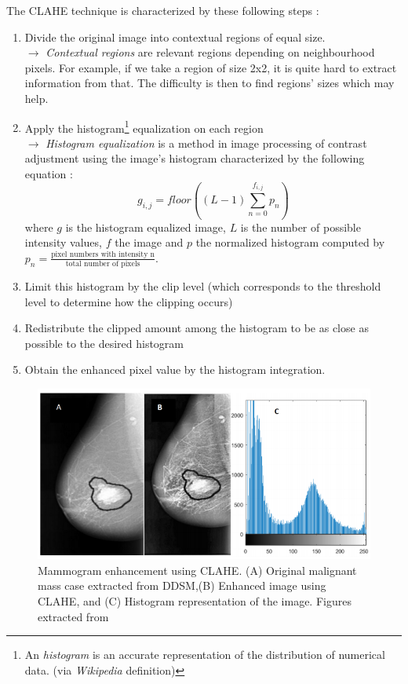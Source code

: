 \documentclass[11pt, openany]{report}
\theoremstyle{plain}
\theoremstyle{definition}
\theoremstyle{remark}
\begin{document}
The CLAHE technique is characterized by these following steps \cite{breast-cancer}: 
\begin{enumerate}
\item Divide the original image into contextual regions of equal size. \\
	  $\rightarrow$ \textit{Contextual regions} are relevant regions depending on neighbourhood pixels. For example, if we take a region of size 2x2, it is quite hard to extract information from that. The difficulty is then to find regions' sizes which may help.   
  
\item Apply the histogram\footnote{An \textit{histogram} is an accurate representation of the distribution of numerical data. (via \textit{Wikipedia} \cite{wiki} definition)} equalization on each region \\ 
	  $\rightarrow$ \textit{Histogram equalization} is a method in image processing of contrast adjustment using the image's histogram characterized by the following equation \cite{book-digital-processing}: 
	  $$ g_{i,j} = floor((L-1) \sum_{n=0}^{f_{i,j}} p_{n}) $$ where $g$ is the histogram equalized image, $L$ is the number of possible intensity values, $f$ the image and $p$ the normalized histogram computed by $p_{n} = \frac{\text{pixel numbers with intensity n}}{\text{total number of pixels}}$. 
	  
\item Limit this histogram by the clip level (which corresponds to the threshold level to determine how the clipping occurs) 

\item Redistribute the clipped amount among the histogram to be as close as possible to the desired histogram

\item Obtain the enhanced pixel value by the histogram integration. 
\end{enumerate}

\begin{figure}[h]
  \centering
  \includegraphics[scale=0.55]{figures/CLAHE.png}
  \caption{Mammogram enhancement using CLAHE. (A) Original malignant mass case extracted from DDSM,(B) Enhanced image using CLAHE, and (C) Histogram representation of the image. Figures extracted from \cite{breast-cancer}}
  \label{fig:CLAHE}
\end{figure}
\end{document}
